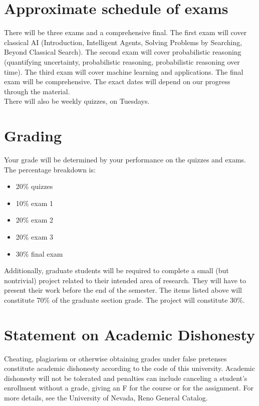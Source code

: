 \documentclass{article}
\begin{document}
\section*{Approximate schedule of exams}

There will be three exams and a comprehensive final. The first exam
will cover classical AI (Introduction, Intelligent Agents, Solving
Problems by Searching, Beyond Classical Search). The second exam will
cover probabilistic reasoning (quantifying uncertainty, probabilistic
reasoning, probabilistic reasoning over time). The third exam will
cover machine learning and applications. The final exam will be
comprehensive. The exact dates will depend on our progress through the
material.\\

\noindent
There will also be weekly quizzes, on Tuesdays.

\section*{Grading}

Your grade will be determined by your performance on the quizzes and
exams. The percentage breakdown is:

\begin{itemize}
  \item 20\% quizzes
  \item 10\% exam 1
  \item 20\% exam 2
  \item 20\% exam 3
  \item 30\% final exam
\end{itemize}

Additionally, graduate students will be required to complete a small
(but nontrivial) project related to their intended area of
research. They will have to present their work before the end of the
semester. The items listed above will constitute 70\% of the graduate
section grade. The project will constitute 30\%.

\section*{Statement on Academic Dishonesty}
Cheating, plagiarism or otherwise obtaining grades under false
pretenses constitute academic dishonesty according to the code of this
university. Academic dishonesty will not be tolerated and penalties
can include canceling a student's enrollment without a grade, giving
an F for the course or for the assignment. For more details, see the
University of Nevada, Reno General Catalog.
\end{document}
